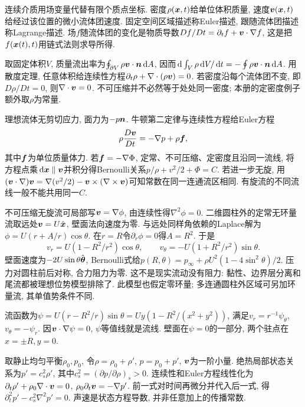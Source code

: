 
连续介质用场变量代替有限个质点坐标. 密度$\rho(\boldsymbol{x},t)$给单位体积质量, 速度$\boldsymbol{v}(\boldsymbol{x},t)$给经过该位置的微小流体团速度. 固定空间区域描述称Euler描述, 跟随流体团描述称Lagrange描述. 场$f$随流体团的变化是物质导数$Df/Dt=\partial_tf+\boldsymbol{v}\cdot\nabla f$, 这是把$f(\boldsymbol{x}(t),t)$用链式法则求导所得.

取固定体积$V$, 质量流出率为$\oint_{\partial V}\rho\boldsymbol{v}\cdot\boldsymbol{n}\,\mathrm d A$, 因而$\,\mathrm d\int_V\rho\,\mathrm d V/\,\mathrm d t=-\oint\rho\boldsymbol{v}\cdot\boldsymbol{n}\,\mathrm d A$. 用散度定理, 任意体积给连续性方程$\partial_t\rho+\nabla\cdot(\rho\boldsymbol{v})=0$. 若密度沿每个流体团不变, 即$D\rho/Dt=0$, 则$\nabla\cdot\boldsymbol{v}=0$. 不可压缩并不必然等于处处同一密度; 本册的定密度例子额外取$\rho$为常量.

理想流体无剪切应力, 面力为$-p\boldsymbol{n}$. 牛顿第二定律与连续性方程给Euler方程
\[
\rho\frac{D\boldsymbol{v}}{Dt}=-\nabla p+\rho\boldsymbol{f},
\]
其中$\boldsymbol{f}$为单位质量体力. 若$\boldsymbol{f}=-\nabla\Phi$, 定常、不可压缩、定密度且沿同一流线, 将方程点乘$\,\mathrm d\boldsymbol{x}\parallel\boldsymbol{v}$并积分得Bernoulli关系$p/\rho+v^2/2+\Phi=C$. 若进一步无旋, 用$(\boldsymbol{v}\cdot\nabla)\boldsymbol{v}=\nabla(v^2/2)-\boldsymbol{v}\times(\nabla\times\boldsymbol{v})$可知常数在同一连通流区相同. 有旋流的不同流线一般不能共用同一$C$.


不可压缩无旋流可局部写$\boldsymbol{v}=\nabla\phi$, 由连续性得$\nabla^2\phi=0$. 二维圆柱外的定常无环量流取远处$\boldsymbol{v}=U\hat{\boldsymbol{x}}$, 壁面法向速度为零. 与远处同样角依赖的Laplace解为$\phi=U(r+A/r)\cos\theta$. 在$r=R$令$\partial_r\phi=0$得$A=R^2$. 于是
\[
v_r=U(1-R^2/r^2)\cos\theta,\qquad
v_\theta=-U(1+R^2/r^2)\sin\theta.
\]
壁面速度为$-2U\sin\theta\hat{\boldsymbol{\theta}}$, Bernoulli式给$p(R,\theta)=p_\infty+\rho U^2(1-4\sin^2\theta)/2$. 压力对圆柱前后对称, 合力阻力为零. 这不是现实流动没有阻力: 黏性、边界层分离和尾流都被理想位势模型排除了. 此模型也假定零环量; 多连通圆柱外区域可另加环量流, 其单值势条件不同.

流函数为$\psi=U(r-R^2/r)\sin\theta=Uy(1-R^2/(x^2+y^2))$, 满足$v_r=r^{-1}\psi_\theta$, $v_\theta=-\psi_r$. 因$\boldsymbol{v}\cdot\nabla\psi=0$, $\psi$等值线就是流线. 壁面在$\psi=0$的一部分, 两个驻点在$x=\pm R,y=0$.


取静止均匀平衡$\rho_0,p_0$, 令$\rho=\rho_0+\rho'$, $p=p_0+p'$, $\boldsymbol{v}$为一阶小量. 绝热局部状态关系为$p'=c_s^2\rho'$, 其中$c_s^2=(\partial p/\partial\rho)_s>0$. 连续性和Euler方程线性化为$\partial_t\rho'+\rho_0\nabla\cdot\boldsymbol{v}=0$, $\rho_0\partial_t\boldsymbol{v}=-\nabla p'$. 前一式对时间再微分并代入后一式, 得$\partial_t^2p'-c_s^2\nabla^2p'=0$. 声速是状态方程导数, 并非任意加上的传播常数.


